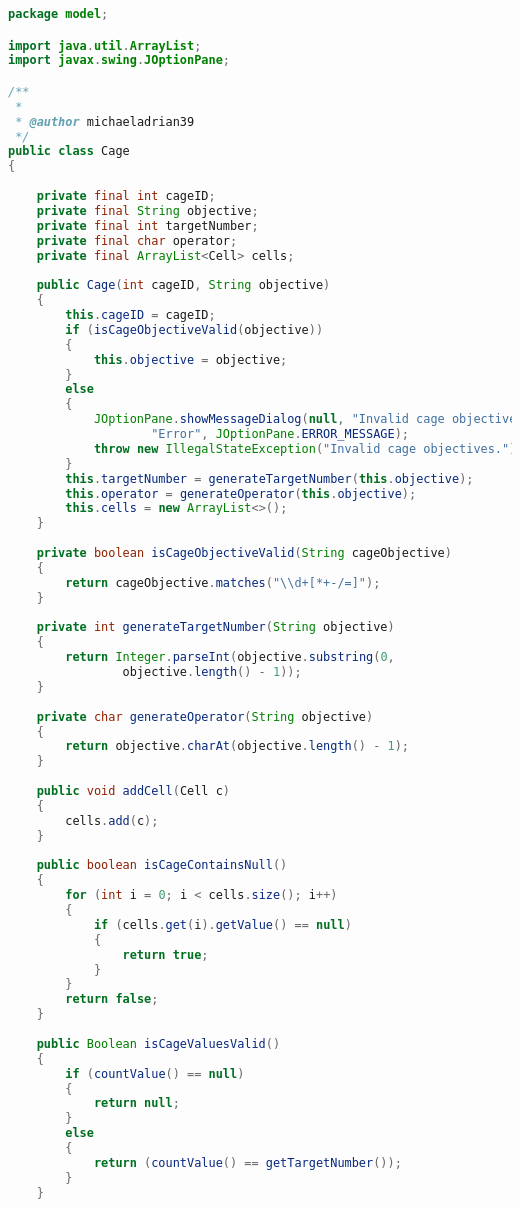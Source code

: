 \begin{lstlisting}[language=Java,basicstyle=\tiny,caption=Cage.java]
package model;

import java.util.ArrayList;
import javax.swing.JOptionPane;

/**
 *
 * @author michaeladrian39
 */
public class Cage
{
    
    private final int cageID;
    private final String objective;
    private final int targetNumber;
    private final char operator;
    private final ArrayList<Cell> cells;
    
    public Cage(int cageID, String objective)
    {
        this.cageID = cageID;
        if (isCageObjectiveValid(objective))
        {
            this.objective = objective;
        }
        else
        {
            JOptionPane.showMessageDialog(null, "Invalid cage objectives.", 
                    "Error", JOptionPane.ERROR_MESSAGE);
            throw new IllegalStateException("Invalid cage objectives.");
        }
        this.targetNumber = generateTargetNumber(this.objective);
        this.operator = generateOperator(this.objective);
        this.cells = new ArrayList<>();
    }
    
    private boolean isCageObjectiveValid(String cageObjective)
    {
        return cageObjective.matches("\\d+[*+-/=]");
    }
    
    private int generateTargetNumber(String objective)
    {
        return Integer.parseInt(objective.substring(0, 
                objective.length() - 1));
    }
    
    private char generateOperator(String objective)
    {
        return objective.charAt(objective.length() - 1);
    }
    
    public void addCell(Cell c)
    {
        cells.add(c);
    }
    
    public boolean isCageContainsNull()
    {
        for (int i = 0; i < cells.size(); i++)
        {
            if (cells.get(i).getValue() == null)
            {
                return true;
            }
        }
        return false;
    }
    
    public Boolean isCageValuesValid()
    {
        if (countValue() == null)
        {
            return null;
        }
        else
        {
            return (countValue() == getTargetNumber());
        }
    }
    

\end{lstlisting}
